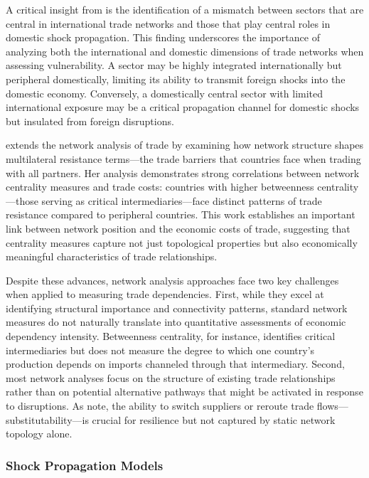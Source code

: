 \documentclass[final,1p,times,authoryear]{elsarticle}
\begin{document}
A critical insight from \cite{Costa2022} is the identification of a mismatch between sectors that are central in international trade networks and those that play central roles in domestic shock propagation. This finding underscores the importance of analyzing both the international and domestic dimensions of trade networks when assessing vulnerability. A sector may be highly integrated internationally but peripheral domestically, limiting its ability to transmit foreign shocks into the domestic economy. Conversely, a domestically central sector with limited international exposure may be a critical propagation channel for domestic shocks but insulated from foreign disruptions.

\cite{Caputo2024} extends the network analysis of trade by examining how network structure shapes multilateral resistance terms—the trade barriers that countries face when trading with all partners. Her analysis demonstrates strong correlations between network centrality measures and trade costs: countries with higher betweenness centrality—those serving as critical intermediaries—face distinct patterns of trade resistance compared to peripheral countries. This work establishes an important link between network position and the economic costs of trade, suggesting that centrality measures capture not just topological properties but also economically meaningful characteristics of trade relationships.

Despite these advances, network analysis approaches face two key challenges when applied to measuring trade dependencies. First, while they excel at identifying structural importance and connectivity patterns, standard network measures do not naturally translate into quantitative assessments of economic dependency intensity. Betweenness centrality, for instance, identifies critical intermediaries but does not measure the degree to which one country's production depends on imports channeled through that intermediary. Second, most network analyses focus on the structure of existing trade relationships rather than on potential alternative pathways that might be activated in response to disruptions. As \cite{Cerina2015} note, the ability to switch suppliers or reroute trade flows—substitutability—is crucial for resilience but not captured by static network topology alone.

\subsubsection{Shock Propagation Models}
\end{document}
